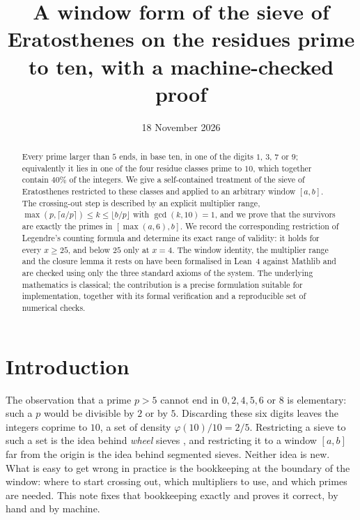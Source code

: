 \documentclass[11pt]{amsart}
\title[A window sieve on the residues prime to 10]{A window form of the sieve of Eratosthenes on the residues prime to ten, with a machine-checked proof}
\date{18 November 2026}
\theoremstyle{definition}
\theoremstyle{remark}
\begin{document}
\begin{abstract}
Every prime larger than $5$ ends, in base ten, in one of the digits $1$, $3$, $7$ or $9$; equivalently it lies in one of the four residue classes prime to $10$, which together contain $40\%$ of the integers. We give a self-contained treatment of the sieve of Eratosthenes restricted to these classes and applied to an arbitrary window $[a,b]$. The crossing-out step is described by an explicit multiplier range, $\max(p,\lceil a/p\rceil)\le k\le\lfloor b/p\rfloor$ with $\gcd(k,10)=1$, and we prove that the survivors are exactly the primes in $[\max(a,6),b]$. We record the corresponding restriction of Legendre's counting formula and determine its exact range of validity: it holds for every $x\ge 25$, and below $25$ only at $x=4$. The window identity, the multiplier range and the closure lemma it rests on have been formalised in Lean~4 against Mathlib and are checked using only the three standard axioms of the system. The underlying mathematics is classical; the contribution is a precise formulation suitable for implementation, together with its formal verification and a reproducible set of numerical checks.
\end{abstract}

\maketitle

\section{Introduction}

The observation that a prime $p>5$ cannot end in $0,2,4,5,6$ or $8$ is elementary: such a $p$ would be divisible by $2$ or by $5$. Discarding these six digits leaves the integers coprime to $10$, a set of density $\varphi(10)/10=2/5$. Restricting a sieve to such a set is the idea behind \emph{wheel} sieves \cite{Pritchard1981}, and restricting it to a window $[a,b]$ far from the origin is the idea behind segmented sieves. Neither idea is new. What is easy to get wrong in practice is the bookkeeping at the boundary of the window: where to start crossing out, which multipliers to use, and which primes are needed. This note fixes that bookkeeping exactly and proves it correct, by hand and by machine.
\end{document}
